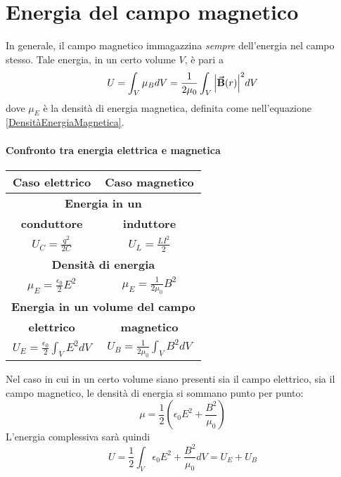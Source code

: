 \section{Energia del campo magnetico}
In generale, il campo magnetico immagazzina \textit{sempre} dell'energia nel campo stesso. Tale energia, in un certo volume $V$, è pari a
\begin{equation}
	U=\int_V\mu_BdV=\frac{1}{2\mu_0}\int_V\abs{\vb*{\va{B}}(r)}^2dV
\end{equation}
dove $\mu_E$ è la densità di energia magnetica, definita come nell'equazione \eqref{DensitàEnergiaMagnetica}.
\paragraph{Confronto tra energia elettrica e magnetica}
\begin{center}
	\begin{tabular}{p{}p{}}
		\multicolumn{1}{c|}{\textbf{Caso elettrico}} &
		\multicolumn{1}{c}{\textbf{Caso magnetico}} \\ \hline
		\multicolumn{2}{c}{\textbf{Energia in un}}\\
		\multicolumn{1}{c|}{\textbf{conduttore}} &
		\multicolumn{1}{c}{\textbf{induttore}} \\ \hline
		\multicolumn{1}{c|}{$\displaystyle U_C=\frac{q^2}{2C}$} & \multicolumn{1}{c}{$\displaystyle U_L=\frac{LI^2}{2}$}\\ \hline
		\multicolumn{2}{c}{\textbf{Densità di energia}}\\ \hline
		\multicolumn{1}{c|}{$\displaystyle \mu_E=\frac{\epsilon_0}{2}E^2$} & \multicolumn{1}{c}{$\displaystyle \mu_E=\frac{1}{2\mu_0}B^2$}\\ \hline
		\multicolumn{2}{c}{\textbf{Energia in un volume del campo}}\\ 
		\multicolumn{1}{c|}{\textbf{elettrico}} &
		\multicolumn{1}{c}{\textbf{magnetico}} \\ \hline
		\multicolumn{1}{c|}{$\displaystyle U_E=\frac{\epsilon_0}{2}\int_V E^2dV$} & \multicolumn{1}{c}{$\displaystyle U_B=\frac{1}{2\mu_0}\int_V B^2dV$}\\
	\end{tabular}
\end{center}
Nel caso in cui in un certo volume siano presenti sia il campo elettrico, sia il campo magnetico, le densità di energia si sommano punto per punto:
\begin{equation}
	\mu=\frac{1}{2}\left(\epsilon_0E^2+\frac{B^2}{\mu_0}\right)
\end{equation}
L'energia complessiva sarà quindi
\begin{equation}
	U=\frac{1}{2}\int_V \epsilon_0E^2+\frac{B^2}{\mu_0}dV=U_E+U_B
\end{equation}
